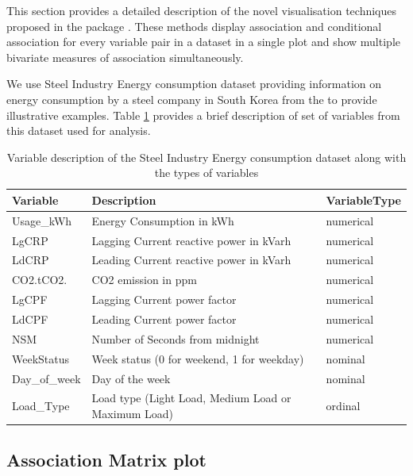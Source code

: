 This section provides a detailed description of the novel visualisation
techniques proposed in the package . These methods
display association and conditional association for every variable pair
in a dataset in a single plot and show multiple bivariate measures of
association simultaneously.

We use Steel Industry Energy consumption dataset providing information
on energy consumption by a steel company in South Korea from the
\citep{Dua2019} to provide illustrative examples. Table
\ref{tab:steelindustry} provides a brief description of set of variables
from this dataset used for analysis.

\begin{Schunk}
\begin{table}

\caption{\label{tab:steelindustry}Variable description of the Steel Industry Energy consumption dataset along with the types of variables}
\centering
\begin{tabular}[t]{lll}
\toprule
Variable & Description & VariableType\\
\midrule
Usage\_kWh & Energy Consumption in kWh & numerical\\
LgCRP & Lagging Current reactive power in kVarh & numerical\\
LdCRP & Leading Current reactive power in kVarh & numerical\\
CO2.tCO2. & CO2 emission in ppm & numerical\\
LgCPF & Lagging Current power factor & numerical\\
\addlinespace
LdCPF & Leading Current power factor & numerical\\
NSM & Number of Seconds from midnight & numerical\\
WeekStatus & Week status (0 for weekend, 1 for weekday) & nominal\\
Day\_of\_week & Day of the week & nominal\\
Load\_Type & Load type (Light Load, Medium Load or Maximum Load) & ordinal\\
\bottomrule
\end{tabular}
\end{table}

\end{Schunk}

\hypertarget{association-matrix-plot}{%
\subsection{Association Matrix plot}\label{association-matrix-plot}}

